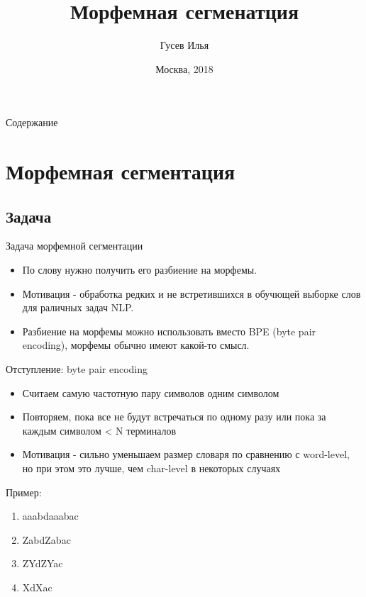 \documentclass[10pt]{beamer}
\title[Ввдение в обработку естественных языков]{Морфемная сегменатция}
\author[Гусев Илья]{Гусев Илья}
\institute[МФТИ] 
{Московский физико-технический институт\\*}
\date{Москва, 2018}
\begin{document}
\begin{frame}
  \titlepage
\end{frame}

\begin{frame}{Содержание}
\tableofcontents
\end{frame}

\section{Морфемная сегментация}

\subsection{Задача}
\begin{frame}[fragile]{Задача морфемной сегментации}
\begin{itemize}
    \item По слову нужно получить его разбиение на морфемы.\\
    \item Мотивация - обработка редких и не встретившихся в обучющей выборке слов для раличных задач NLP.\\
    \item Разбиение на морфемы можно использовать вместо BPE (byte pair encoding), морфемы обычно имеют какой-то смысл.
\end{itemize}
\end{frame}

\begin{frame}[fragile]{Отступление: byte pair encoding}
\begin{itemize}
    \item Считаем самую частотную пару символов одним символом
    \item Повторяем, пока все не будут встречаться по одному разу или пока за каждым символом < N терминалов
    \item Мотивация - сильно уменьшаем размер словаря по сравнению с word-level, но при этом это лучше, чем char-level в некоторых случаях
\end{itemize}
Пример:\\
\begin{enumerate}
    \item aaabdaaabac
    \item ZabdZabac
    \item ZYdZYac
    \item XdXac
\end{enumerate}
\end{frame}
\end{document}
